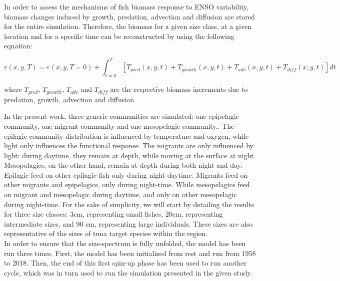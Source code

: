 In order to assess the mechanisms of fish biomass response to ENSO variability, biomass changes induced by growth, predation, advection and diffusion are stored for the entire simulation. Therefore, the biomass for a given size class, at a given location and for a specific time can be reconstructed by using the following equation:

\begin{equation}
\varepsilon(x,y,T) = \varepsilon(x,y,T=0) + \int_{t=0}^{T} \left[ 
T_{pred}(x, y,t) + 
T_{growth}(x, y,t) + 
T_{adv}(x, y,t) + 
T_{diff}(x, y,t) 
\right] dt 
\end{equation}

where $T_{pred}$, $T_{growth}$, $T_{adv}$ and $T_{diff}$ are the respective biomass increments due to predation, growth, advection and diffusion.

In the present work, three generic communities are simulated: one epipelagic community, one migrant community and one mesopelagic community.. The epilagic community distribution is influenced by temperature and oxygen, while light only influences the functional response. The migrants are only influenced by light: during daytime, they remain at depth, while moving at the surface at night. Mesopolagics, on the other hand, remain at depth during both night and day. Epilagic feed on other epilagic fish only during night daytime. Migrants feed on other migrants and epipelagics, only during night-time. While mesopelagics feed on migrant and mesopelagic during daytime, and only on other mesopelagic during night-time.
For the sake of simplicity, we will start by detailing the results for three size classes: 3cm, representing small fishes, 20cm, representing intermediate sizes, and 90 cm, representing large individuals. These sizes are also representative of the sizes of tuna target species within the region.\\

In order to ensure that the size-spectrum is fully unfolded, the model has been run three times. First, the model has been initialized from rest and run from 1958 to 2018. Then, the end of this first spin-up phase has been used to run another cycle, which was in turn used to run the simulation presented in the given study.

